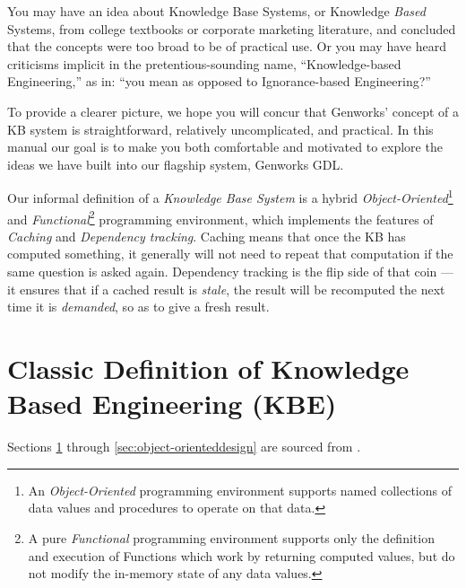\documentclass [11pt]{book}
\begin{document}
\label{sec:knowledgebaseconceptsaccordingtogenworks}

You may have an idea about Knowledge Base Systems,
or Knowledge \emph{Based} Systems, from college textbooks or corporate marketing
literature, and concluded that the concepts were too broad to be of
practical use. Or you may have heard criticisms implicit in the
pretentious-sounding name, ``Knowledge-based Engineering,'' as in:
``you mean as opposed to Ignorance-based Engineering?'' 

To provide a clearer picture, we hope you will concur that Genworks'
concept of a KB system is straightforward, relatively uncomplicated,
and practical. In this manual our goal is to make you both comfortable
and motivated to explore the ideas we have built into our flagship
system, Genworks GDL.

Our informal definition of a \emph{Knowledge Base System} is a hybrid \emph{Object-Oriented}\footnote{An \emph{Object-Oriented} programming environment supports named collections of data values and procedures to operate on that data.} and \emph{Functional}\footnote{A pure \emph{Functional} programming environment supports only the definition and execution of Functions which work by returning
computed values, but do not modify the in-memory state of any data values.} programming environment, which implements the features of \emph{Caching} and \emph{Dependency tracking}. Caching means that once the KB has computed something, it
generally will not need to repeat that computation if the same
question is asked again. Dependency tracking is the flip side of that
coin --- it ensures that if a cached result is \emph{stale}, the result will be recomputed the next time it is \emph{demanded}, so as to give a fresh result.

\section{Classic Definition of Knowledge Based Engineering (KBE)}

\label{sec:classicdefinitionofknowledgebasedengineering(kbe)}

Sections 
\ref{sec:classicdefinitionofknowledgebasedengineering(kbe)} through 
\ref{sec:object-orienteddesign} are sourced from 
\cite{LaRocca}.
\end{document}

